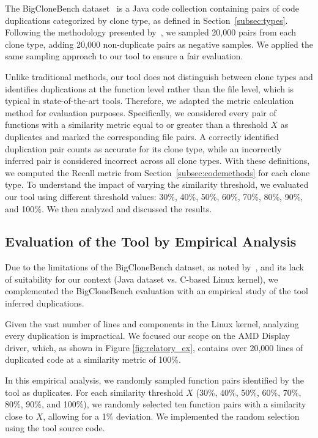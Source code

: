 The BigCloneBench dataset~\citep{bigclonebench} is a Java code collection containing pairs of code duplications categorized by clone type, as defined in Section~\ref{subsec:types}.
%
Following the methodology presented by~\citep{tailor}, we sampled 20,000 pairs from each clone type, adding 20,000 non-duplicate pairs as negative samples. We applied the same sampling approach to our tool to ensure a fair evaluation.

Unlike traditional methods, our tool does not distinguish between clone types and identifies duplications at the function level rather than the file level, which is typical in state-of-the-art tools. Therefore, we adapted the metric calculation method for evaluation purposes. Specifically, we considered every pair of functions with a similarity metric equal to or greater than a threshold \(X\) as duplicates and marked the corresponding file pairs. A correctly identified duplication pair counts as accurate for its clone type, while an incorrectly inferred pair is considered incorrect across all clone types. With these definitions, we computed the Recall metric from Section~\ref{subsec:codemethods} for each clone type.
%
To understand the impact of varying the similarity threshold, we evaluated our tool using different threshold values: 30\%, 40\%, 50\%, 60\%, 70\%, 80\%, 90\%, and 100\%. We then analyzed and discussed the results.

\subsection{Evaluation of the Tool by Empirical Analysis}

\label{sec:metemp}

Due to the limitations of the BigCloneBench dataset, as noted by~\cite{bigfail}, and its lack of suitability for our context (Java dataset vs. C-based Linux kernel), we complemented the BigCloneBench evaluation with an empirical study of the tool inferred duplications.

Given the vast number of lines and components in the Linux kernel, analyzing every duplication is impractical. We focused our scope on the AMD Display driver, which, as shown in Figure \ref{fig:relatory_ex}, contains over 20,000 lines of duplicated code at a similarity metric of 100\%.

In this empirical analysis, we randomly sampled function pairs identified by the tool as duplicates. For each similarity threshold \(X\) (30\%, 40\%, 50\%, 60\%, 70\%, 80\%, 90\%, and 100\%), we randomly selected ten function pairs with a similarity close to \(X\), allowing for a 1\% deviation. We implemented the random selection using the tool source code.

